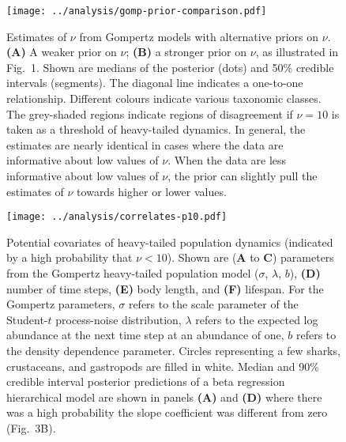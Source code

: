 \documentclass[12pt]{article}
\begin{document}
\clearpage

\begin{figure}[htbp]
\begin{center}
\texttt{[image: ../analysis/gomp-prior-comparison.pdf]}

\caption{Estimates of $\nu$ from Gompertz models with alternative priors on $\nu$. \textbf{(A)} A weaker prior on $\nu$; \textbf{(B)} a stronger prior on $\nu$, as illustrated in Fig.~1. Shown are medians of the posterior (dots) and 50\% credible intervals (segments). The diagonal line indicates a one-to-one relationship. Different colours indicate various taxonomic classes. The grey-shaded regions indicate regions of disagreement if $\nu = 10$ is taken as a threshold of heavy-tailed dynamics. In general, the estimates are nearly identical in cases where the data are informative about low values of $\nu$. When the data are less informative about low values of $\nu$, the prior can slightly pull the estimates of $\nu$ towards higher or lower values.}

\label{fig:alt-priors}
\end{center}
\end{figure}

\clearpage

\begin{figure}[htbp]
\begin{center}
\texttt{[image: ../analysis/correlates-p10.pdf]}

\caption{Potential covariates of heavy-tailed population dynamics (indicated by a high probability that $\nu < 10$). Shown are (\textbf{A} to \textbf{C}) parameters from the Gompertz heavy-tailed population model ($\sigma$, $\lambda$, $b$), \textbf{(D)} number of time steps, \textbf{(E)} body length, and \textbf{(F)} lifespan. For the Gompertz parameters, $\sigma$ refers to the scale parameter of the Student-$t$ process-noise distribution, $\lambda$ refers to the expected log abundance at the next time step at an abundance of one, $b$ refers to the density dependence parameter. Circles representing a few sharks, crustaceans, and gastropods are filled in white. Median and 90\% credible interval posterior predictions of a beta regression hierarchical model are shown in panels \textbf{(A)} and \textbf{(D)} where there was a high probability the slope coefficient was different from zero (Fig.~3B).}

\label{fig:correlates}
\end{center}
\end{figure}
\end{document}
